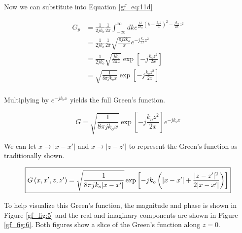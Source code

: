 \noindent Now we can substitute into Equation \ref{gf_eq:11d}

\begin{equation}
\begin{aligned}
G_p &= \frac{1}{2jk_o}\frac{1}{2\pi}\int_{-\infty}^{\infty}dk e^{\frac{jx}{2k_o}\left(k  -\frac{k_oz}{x}\right)^2- \frac{jk_o}{2x}z^2 } \\
&= \frac{1}{2jk_o}\frac{1}{2\pi} \sqrt{\frac{\pi j2k_o}{x}}e^{-j\frac{k_o}{2x}z^2 } \\
&= \frac{1}{2jk_o}\sqrt{\frac{jk_o}{2\pi x}}\exp\left[-j\frac{k_oz^2}{2x} \right]\\
&= \sqrt{\frac{1}{8\pi j k_ox}}\exp\left[-j\frac{k_oz^2}{2x} \right]\\
\end{aligned}
\label{gf_eq:11f}
\end{equation}
 \renewcommand{\baselinestretch}{2} \small\normalsize
 
\noindent Multiplying by $e^{-jk_ox}$ yields the full Green's function.

\begin{equation}
G= \sqrt{\frac{1}{8\pi jk_ox}}\exp\left[-j\frac{k_oz^2}{2x} \right]e^{-jk_ox}
\label{gf_eq:11fa}
\end{equation}
  \renewcommand{\baselinestretch}{2} \small\normalsize
  
We can let $x\rightarrow |x-x'|$ and $x\rightarrow |z-z'|$ to represent the Green's function as traditionally shown.

\begin{equation}
\boxed{G\left(x,x',z,z' \right)= \sqrt{\frac{1}{8\pi jk_o|x-x'|}}\exp\left[-jk_o\left(|x-x'| + \frac{|z-z'|^2}{2|x-x'|}\right) \right]}\\
\label{gf_eq:11fb}
\end{equation}
 \renewcommand{\baselinestretch}{2} \small\normalsize
 
To help visualize this Green's function, the magnitude and phase is shown in Figure \ref{gf_fig:5} and the real and imaginary components are shown in Figure \ref{gf_fig:6}. Both figures show a slice of the Green's function along $z = 0$. 

